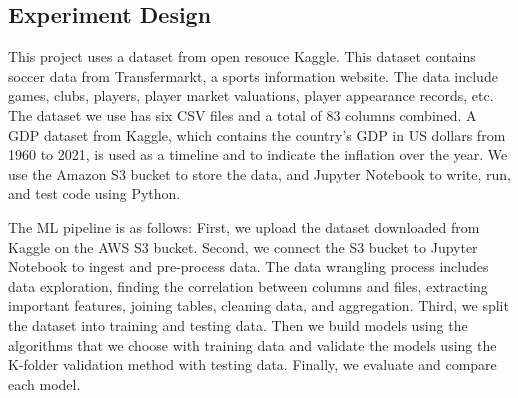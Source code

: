 \documentclass[conference]{IEEEtran}
\begin{document}
\subsection{Experiment Design}
This project uses a dataset from open resouce Kaggle. \cite{b5} This dataset contains soccer data from Transfermarkt, a sports information website. The data include games, clubs, players, player market valuations, player appearance records, etc. The dataset we use has six CSV files and a total of 83 columns combined. A GDP dataset from Kaggle, which contains the country's GDP in US dollars from 1960 to 2021, is used as a timeline and to indicate the inflation over the year. We use the Amazon S3 bucket to store the data, and Jupyter Notebook to write, run, and test code using Python. \par
The ML pipeline is as follows: First, we upload the dataset downloaded from Kaggle on the AWS S3 bucket. Second, we connect the S3 bucket to Jupyter Notebook to ingest and pre-process data. The data wrangling process includes data exploration, finding the correlation between columns and files, extracting important features, joining tables, cleaning data, and aggregation. Third, we split the dataset into training and testing data. Then we build models using the algorithms that we choose with training data and validate the models using the K-folder validation method with testing data. Finally, we evaluate and compare each model.
\end{document}
